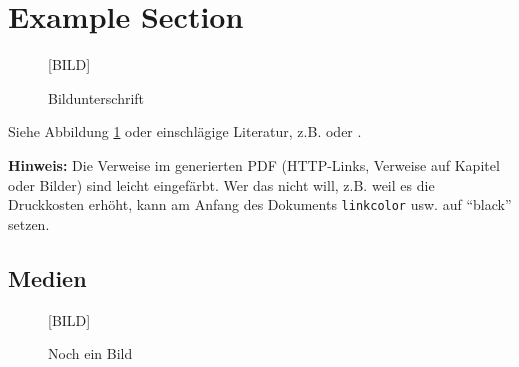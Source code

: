 \documentclass[11pt,a4paper,twoside]{article}
\begin{document}

\iffalse

\cleardoublepage %
\section{Example Section}

\begin{figure}%


  \begin{center}\LARGE [BILD]\end{center}
  \caption{Bildunterschrift}
  \label{fig:beispielbild}
\end{figure}


Siehe Abbildung \ref{fig:beispielbild} oder einschlägige Literatur, z.B.
\cite[Seite 6]{Brill1992ATagger} oder \cite{Porter1980AnStripping}.

\bigskip %
\textbf{Hinweis:} Die Verweise im generierten PDF (HTTP-Links, Verweise auf Kapitel oder Bilder) sind leicht eingefärbt. Wer das nicht will, z.B. weil es die Druckkosten erhöht, kann am Anfang des Dokuments \texttt{linkcolor} usw. auf ``black'' setzen.


\subsection{Medien}

\begin{figure}
  \begin{center}\LARGE [BILD]\end{center}
  \caption{Noch ein Bild}
  \label{fig:beispielbild2}
\end{figure}
\end{document}
